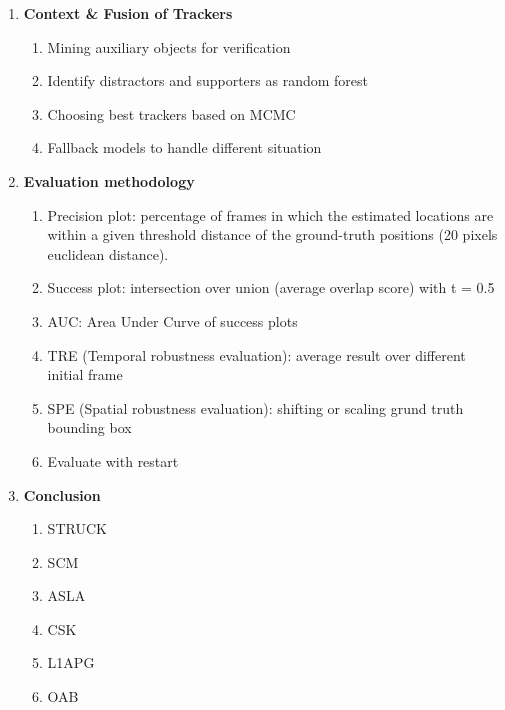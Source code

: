 \begin{enumerate}
    \item \textbf{Context \& Fusion of Trackers}
        \begin{enumerate}
            \item Mining auxiliary objects for verification \cite{yang2009context}
            \item Identify distractors and supporters as random forest \cite{dinh2011context}
            \item Choosing best trackers based on MCMC \cite{kwon2011tracking}
            \item Fallback models to handle different situation \cite{santner2010prost}
        \end{enumerate}
        
    \item \textbf{Evaluation methodology}
        \begin{enumerate}
            \item Precision plot: percentage of frames in which the estimated locations are within a given threshold distance of the ground-truth positions (20 pixels euclidean distance).
            \item Success plot: intersection over union (average overlap score) with t = 0.5
            \item AUC: Area Under Curve of success plots
            \item TRE (Temporal robustness evaluation): average result over different initial frame
            \item SPE (Spatial robustness evaluation): shifting or scaling grund truth bounding box
            \item Evaluate with restart
        \end{enumerate}
    
    \item \textbf{Conclusion}
        \begin{enumerate}
            \item STRUCK \cite{hare2016struck}
            \item SCM \cite{zhong2012robust}
            \item ASLA \cite{jia2012visual}
            \item CSK \cite{henriques2012exploiting}
            \item L1APG \cite{bao2012real}
            \item OAB \cite{grabner2006real}
        \end{enumerate}
\end{enumerate}

